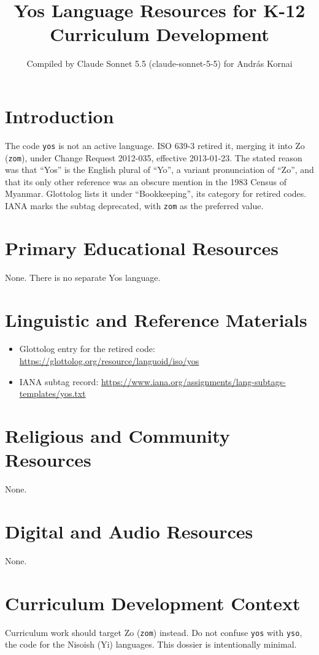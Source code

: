 \documentclass[12pt]{article}
\title{Yos Language Resources for K-12 Curriculum Development}
\author{Compiled by Claude Sonnet 5.5 (claude-sonnet-5-5) for Andr\'as Kornai}
\date{}
\begin{document}
\maketitle

\section{Introduction}
The code \texttt{yos} is not an active language. ISO 639-3 retired it, merging it into Zo (\texttt{zom}), under Change Request 2012-035, effective 2013-01-23. The stated reason was that ``Yos'' is the English plural of ``Yo'', a variant pronunciation of ``Zo'', and that its only other reference was an obscure mention in the 1983 Census of Myanmar. Glottolog lists it under ``Bookkeeping'', its category for retired codes. IANA marks the subtag deprecated, with \texttt{zom} as the preferred value.

\section{Primary Educational Resources}
None. There is no separate Yos language.

\section{Linguistic and Reference Materials}
\begin{itemize}
\item Glottolog entry for the retired code: \url{https://glottolog.org/resource/languoid/iso/yos}
\item IANA subtag record: \url{https://www.iana.org/assignments/lang-subtags-templates/yos.txt}
\end{itemize}

\section{Religious and Community Resources}
None.

\section{Digital and Audio Resources}
None.

\section{Curriculum Development Context}
Curriculum work should target Zo (\texttt{zom}) instead. Do not confuse \texttt{yos} with \texttt{yso}, the code for the Nisoish (Yi) languages. This dossier is intentionally minimal.
\end{document}
